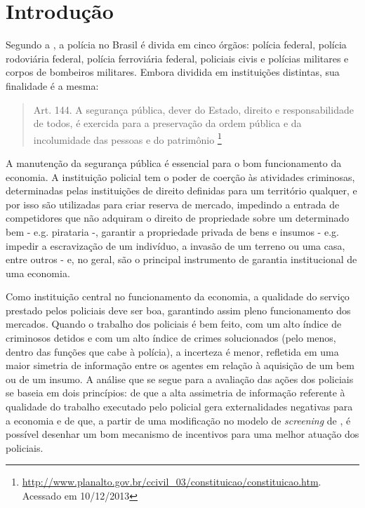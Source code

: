 \documentclass[
	article,			%
	12pt,				%
	oneside,			%
	a4paper,			%
	english,			%
	brazil,				%
	]{abntex2}
\begin{document}
\section*{Introdução}

Segundo a , a polícia no Brasil é divida em cinco órgãos: polícia federal, polícia rodoviária federal, polícia ferroviária federal, policiais civis e polícias militares e corpos de bombeiros militares. Embora dividida em instituições distintas, sua finalidade é a mesma:

\begin{quotation}
Art. 144. A segurança pública, dever do Estado, direito e responsabilidade de todos, é exercida para a preservação da ordem pública e da incolumidade das pessoas e do patrimônio \footnote{\url{http://www.planalto.gov.br/ccivil_03/constituicao/constituicao.htm}. Acessado em 10/12/2013}
\end{quotation}

A manutenção da segurança pública é essencial para o bom funcionamento da economia. A instituição policial tem o poder de coerção às atividades criminosas, determinadas pelas instituições de direito definidas para um território qualquer, e por isso são utilizadas para criar reserva de mercado, impedindo a entrada de competidores que não adquiram o direito de propriedade sobre um determinado bem - e.g. pirataria -, garantir a propriedade privada de bens e insumos - e.g. impedir a escravização de um indivíduo, a invasão de um terreno ou uma casa, entre outros - e, no geral, são o principal instrumento de garantia institucional de uma economia.

Como instituição central no funcionamento da economia, a qualidade do serviço prestado pelos policiais deve ser boa, garantindo assim pleno funcionamento dos mercados. Quando o trabalho dos policiais é bem feito, com um alto índice de criminosos detidos e com um alto índice de crimes solucionados (pelo menos, dentro das funções que cabe à polícia), a incerteza é menor, refletida em uma maior simetria de informação entre os agentes em relação à aquisição de um bem ou de um insumo. A análise que se segue para a avaliação das ações dos policiais se baseia em dois princípios: de que a alta assimetria de informação referente à qualidade do trabalho executado pelo policial gera externalidades negativas para a economia e de que, a partir de uma modificação no modelo de \textit{screening} de , é possível desenhar um bom mecanismo de incentivos para uma melhor atuação dos policiais.
\end{document}
